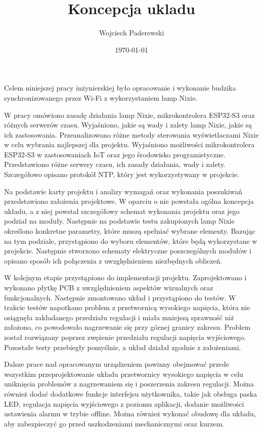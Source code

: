 \documentclass[../main.tex]{subfiles}
\author{Wojciech Paderewski}
\date{\today}
\title{Koncepcja ukladu}
\begin{document}
Celem niniejszej pracy inżynierskiej było opracowanie i wykonanie budzika synchronizowanego przez Wi-Fi z wykorzystaniem lamp Nixie.

W pracy omówiono zasadę działania lamp Nixie, mikrokontrolera ESP32-S3 oraz różnych serwerów czasu.
Wyjaśniono, jakie są wady i zalety lamp Nixie, jakie są ich zastosowania. Przeanalizowano różne metody sterowania wyświetlaczami Nixie w celu wybrania najlepszej dla projektu.
Wyjaśniono możliwości mikrokontrolera ESP32-S3 w zastosowaniach IoT oraz jego środowisko programistyczne.
Przedstawiono różne serwery czasu, ich zasady działania, wady i zalety. Szczegółowo opisano protokół NTP, który jest wykorzystywany w projekcie.

Na podstawie karty projektu i analizy wymagań oraz wykonania poszukiwań przedstawiono założenia projektowe. W oparciu o nie powstała ogólna koncepcja układu,
a z niej powstał szczegółowy schemat wykonania projektu oraz jego podział na moduły. Następnie na podstawie testu zakupionych lamp Nixie określono konkretne parametry, które muszą spełniać wybrane elementy.
Bazując na tym podziale, przystąpiono do wyboru elementów, które będą wykorzystane w projekcie. Następnie stworzono schematy elektryczne poszczególnych modułów i opisano sposób ich połączenia z uwzględnieniem niezbędnych obliczeń.

W kolejnym etapie przystąpiono do implementacji projektu. Zaprojektowano i wykonano płytkę PCB z uwzględnieniem aspektów wizualnych oraz funkcjonalnych. Następnie zmontowano układ i przystąpiono do testów.
W trakcie testów napotkano problem z przetwornicą wysokiego napięcia, która nie osiągnęła zakładanego przedziału regulacji i miała mniejszą sprawność niż założono, co powodowało nagrzewanie się przy górnej granicy zakresu. Problem został rozwiązany poprzez zwężenie przedziału regulacji napięcia wyjściowego.
Pozostałe testy przebiegły pomyślnie, a układ działał zgodnie z założeniami.

Dalsze prace nad opracowanym urządzeniem powinny obejmować przede wszystkim przeprojektowanie układu przetwornicy wysokiego napięcia w celu uniknięcia problemów z nagrzewaniem się i poszerzenia zakresu regulacji. Można również dodać dodatkowe funkcje interfejsu użytkownika, 
takie jak obsługa paska LED, regulacja napięcia wyjściowego z poziomu aplikacji, dodanie możliwości ustawienia alarmu w trybie offline. Można również wykonać obudowę dla układu,
aby zabezpieczyć go przed uszkodzeniami mechanicznymi oraz kurzem.
\end{document}
